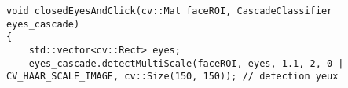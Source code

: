 \begin{lstlisting}
void closedEyesAndClick(cv::Mat faceROI, CascadeClassifier eyes_cascade)
{
	std::vector<cv::Rect> eyes;
	eyes_cascade.detectMultiScale(faceROI, eyes, 1.1, 2, 0 | CV_HAAR_SCALE_IMAGE, cv::Size(150, 150)); // detection yeux
\end{lstlisting}
